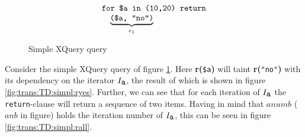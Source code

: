 \begin{myExample}
\label{ex:trans:TD:simpleSeq}
\begin{figure}[h]
\begin{equation*}
\begin{array}{l}
\mbox{\texttt{for \$a in (10,20) return}} \\ \quad 
\underbrace{ \mbox{\texttt{(\$a, "no")}} }_{e_{1}}
\end{array}
\end{equation*}
\caption{Simple XQuery query}
\label{fig:trans:TD:simpQuery}
\end{figure}
Consider the simple XQuery query of figure \ref{fig:trans:TD:simpQuery}. Here \textbf{r(}\texttt{\$a}\textbf{)}
will taint \textbf{r(}\texttt{"no"}\textbf{)} with its dependency on the iterator $I_{\mbox{\texttt{a}}}$, the
result of which is shown in figure \ref{fig:trans:TD:simpl:ryes}. Further, we can see that for each iteration of
$I_{\mbox{\texttt{a}}}$ the \texttt{return}-clause will return a sequence of two items. Having in mind that
$anumb$ ($anb$ in figure) holds the iteration number of $I_{\mbox{\texttt{a}}}$, this can be seen in figure
\ref{fig:trans:TD:simpl:rall}.

\begin{figure}[!h]
\centering
{}
\qquad
{}
\qquad
{}


\end{figure}
\end{myExample}
